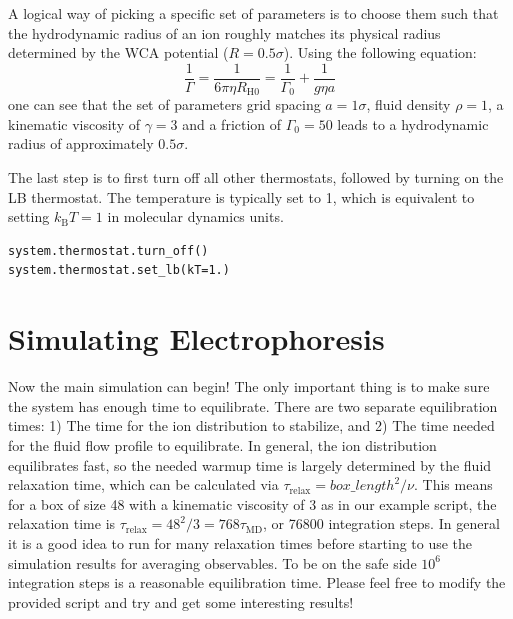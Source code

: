\documentclass[
paper=a4,                       %
fontsize=11pt,                  %
twoside,                        %
footsepline,                    %
headsepline,                    %
headinclude=false,              %
footinclude=false,              %
pagesize,                       %
]{scrartcl}
\begin{document}
A logical way of picking a specific set of parameters is to choose them such that the hydrodynamic radius of an ion roughly matches its physical radius determined by the
WCA potential ($R=0.5\sigma$). Using the following equation:
\begin{equation}
\frac{1}{\Gamma}=\frac{1}{6\pi \eta R_{\mathrm{H0}}}=\frac{1}{\Gamma_0} 
+\frac{1}{g\eta a} 
 \label{effectiveGammaEq}
\end{equation}
one can see that the set of parameters grid spacing $a=1\sigma$, fluid density $\rho=1$, a 
kinematic viscosity of $\gamma=3 $ and a friction of $\Gamma_0=50$ leads to a hydrodynamic radius
of approximately $0.5\sigma$.

The last step is to first turn off all other thermostats, followed by turning on the LB thermostat. The temperature is typically set to 1, which is equivalent to setting
$k_\mathrm{B}T=1$ in molecular dynamics units.

{\small\vspace{0,2cm}
\begin{lstlisting}[numbers=none]
system.thermostat.turn_off()
system.thermostat.set_lb(kT=1.)
\end{lstlisting}
}

\section{Simulating Electrophoresis}
Now the main simulation can begin! The only important thing is to make sure the system has enough time to equilibrate. There are two separate equilibration times: 1) The time for the ion distribution to stabilize, and 2) The time
needed for the fluid flow profile to equilibrate. In general, the ion distribution equilibrates fast, so the needed warmup time is largely determined by the fluid relaxation time, which can be calculated via $\tau_\mathrm{relax} = box\_length^2/\nu$. This means for a box of size 48 with a kinematic viscosity of 3 as in our example script, the relaxation time is $\tau_\mathrm{relax} = 48^2/3 = 768 \tau_\mathrm{MD}$, or 76800 integration steps. In general it is a good idea to run for many relaxation times before starting to use the simulation results for averaging observables. To be on the safe side $10^6$ integration steps is a reasonable equilibration time. Please feel free to modify the provided script and try and get some interesting results!
\end{document}
